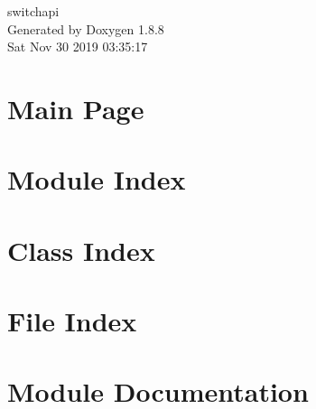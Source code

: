 \documentclass[twoside]{book}
\newcommand{\+}{\discretionary{\mbox{\scriptsize$\hookleftarrow$}}{}{}}
\newcommand{\clearemptydoublepage}{%
  \newpage{\pagestyle{empty}\cleardoublepage}%
}
\begin{document}
\hypersetup{pageanchor=false,
             bookmarks=true,
             bookmarksnumbered=true,
             pdfencoding=unicode
            }
\begin{titlepage}
\vspace*{7cm}
\begin{center}%
{\Large switchapi }\\
\vspace*{1cm}
{\large Generated by Doxygen 1.8.8}\\
\vspace*{0.5cm}
{\small Sat Nov 30 2019 03:35:17}\\
\end{center}
\end{titlepage}
\clearemptydoublepage
\tableofcontents
\clearemptydoublepage
{}
\hypersetup{pageanchor=true}

\chapter{Main Page}
\label{index}\hypertarget{index}{}
\chapter{Module Index}

\chapter{Class Index}

\chapter{File Index}

\chapter{Module Documentation}



























\end{document}
